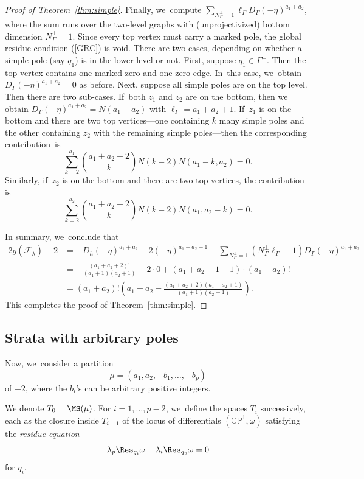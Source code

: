 \begin{proof}[Proof of Theorem~\ref{thm:simple}]
Finally, we~compute $\sum_{N_\Gamma^{\bot} = 1} \ell_\Gamma D_\Gamma (-\eta)^{a_1+a_2}$, where the sum runs over the two-level graphs with (unprojectivized) bottom dimension $N_\Gamma^{\bot} = 1$. Since every top vertex must carry a marked pole, the global residue condition (\ref{GRC}) is void. There are two cases, depending on whether a simple pole (say $q_1$) is in the lower level or not. First, suppose $q_1\in \Gamma^\bot$. Then the top vertex contains one marked zero and one zero edge. In~this case, we~obtain $D_\Gamma (-\eta)^{a_1+a_2} = 0$ as before. Next, suppose all simple poles are on the top level. Then there are two sub-cases. If~both $z_1$ and $z_2$ are on the bottom, then we obtain
$D_\Gamma (-\eta)^{a_1+a_2} = N(a_1+a_2)$ with $\ell_\Gamma = a_1+a_2+1$. If~$z_1$ is on the bottom and there are two top vertices---one containing $k$ many simple poles and the other containing $z_2$ with the remaining simple poles---then the corresponding contribution~is
\[
\sum_{k=2}^{a_1} \binom{a_1+a_2+2}{k} N(k-2) N(a_1-k, a_2) = 0.
\]
Similarly, if~$z_2$ is on the bottom and there are two top vertices, the contribution is
\[
\sum_{k=2}^{a_2} \binom{a_1+a_2+2}{k} N(k-2) N(a_1, a_2-k) = 0.
\]

In summary, we~conclude that
\begin{align*}
2g (\overline{\mathcal F}_\lambda) -2 & = - D_h (-\eta)^{a_1+a_2} - 2 (-\eta)^{a_1+a_2+1} +
\sum_{N_\Gamma^{\bot} = 1} (N_\Gamma^{\bot}\ell_\Gamma - 1) D_\Gamma (-\eta)^{a_1+a_2} \\
& = - \frac{(a_1+a_2+2)!}{(a_1+1)(a_2+1)} - 2\cdot 0 + (a_1+a_2+1-1) \cdot (a_1+a_2)! \\
& = (a_1+a_2)! \left( a_1+a_2 - \frac{(a_1+a_2+2)(a_1+a_2+1)}{(a_1+1)(a_2+1)} \right).
\end{align*}
This completes the proof of Theorem~\ref{thm:simple}.
\end{proof}

\subsection{Strata with arbitrary poles}

Now, we~consider a partition
\[
\mu = (a_1, a_2, -b_1, \ldots, -b_p)
\]
of $-2$, where the $b_i$'s can be arbitrary positive integers.

We denote $T_0= \MS(\mu)$. For $i=1,\ldots,p-2$, we~define the spaces $T_i$ successively, each as the closure inside $T_{i-1}$ of the locus of differentials $(\mathbb{C}\mathbb{P}^1,\omega)$ satisfying the {\em residue equation}
\[
\lambda_{p} \Res_{q_i}\omega-\lambda_{i} \Res_{q_p}\omega=0
\]
for $q_i$.

